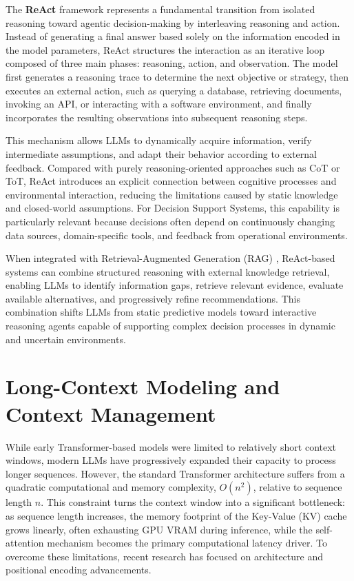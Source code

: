 The \textbf{ReAct} framework \cite{yao2022react} represents a fundamental transition from isolated reasoning toward agentic decision-making by interleaving reasoning and action. Instead of generating a final answer based solely on the information encoded in the model parameters, ReAct structures the interaction as an iterative loop composed of three main phases: reasoning, action, and observation. The model first generates a reasoning trace to determine the next objective or strategy, then executes an external action, such as querying a database, retrieving documents, invoking an API, or interacting with a software environment, and finally incorporates the resulting observations into subsequent reasoning steps.

This mechanism allows LLMs to dynamically acquire information, verify intermediate assumptions, and adapt their behavior according to external feedback. Compared with purely reasoning-oriented approaches such as CoT or ToT, ReAct introduces an explicit connection between cognitive processes and environmental interaction, reducing the limitations caused by static knowledge and closed-world assumptions. For Decision Support Systems, this capability is particularly relevant because decisions often depend on continuously changing data sources, domain-specific tools, and feedback from operational environments.

When integrated with Retrieval-Augmented Generation (RAG) \cite{lewis2020retrieval}, ReAct-based systems can combine structured reasoning with external knowledge retrieval, enabling LLMs to identify information gaps, retrieve relevant evidence, evaluate available alternatives, and progressively refine recommendations. This combination shifts LLMs from static predictive models toward interactive reasoning agents capable of supporting complex decision processes in dynamic and uncertain environments.



\section{Long-Context Modeling and Context Management}
While early Transformer-based models were limited to relatively short context windows, modern LLMs have progressively expanded their capacity to process longer sequences.
However, the standard Transformer architecture suffers from a quadratic computational and memory complexity, $O(n^2)$, relative to sequence length $n$. This constraint turns the context window into a significant bottleneck: as sequence length increases, the memory footprint of the Key-Value (KV) cache grows linearly, often exhausting GPU VRAM during inference, while the self-attention mechanism becomes the primary computational latency driver.
To overcome these limitations, recent research has focused on architecture and positional encoding advancements. 


